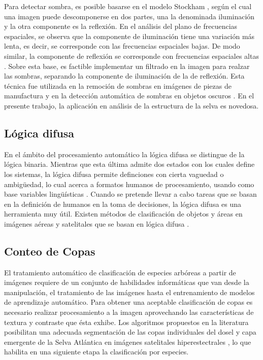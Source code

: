 Para detectar sombra, es posible basarse en el modelo Stockham \cite{stockham_image_1972}, según el cual una imagen puede descomponerse en dos partes, una la denominada iluminación y la otra componente es la reflexión. En el análisis del plano de frecuencias espaciales, se observa que la componente de iluminación tiene una variación más lenta, es decir, se corresponde con las frecuencias espaciales bajas. De modo similar, la componente de reflexión se corresponde con frecuencias espaciales altas \cite{oppenheim_nonlinear_1968}. Sobre esta base, es factible implementar un filtrado en la imagen para realzar las sombras, separando la componente de iluminación de la de reflexión. Esta técnica fue utilizada en la remoción de sombras en imágenes de piezas de manufactura \cite{yang_research_2012} y en la detección automática de sombras en objetos oscuros \cite{etemadnia_automatic_2003}. En el presente trabajo, la aplicación en análisis de la estructura de la selva es novedosa.


\subsection{Lógica difusa} 
En el ámbito del procesamiento automático la lógica difusa se distingue de la lógica binaria. Mientras que esta última admite dos estados con los cuales define los sistemas, la lógica difusa permite definciones con cierta vaguedad o ambigüedad, lo cual acerca a formatos humanos de procesamiento, usando como base variables lingüísticas \cite{zadeh_concept_1975}. Cuando se pretende llevar a cabo tareas que se basan en la definición de humanos en la toma de decisiones, la lógica difusa es una herramienta muy útil. Existen métodos de clasificación de objetos y áreas en imágenes aéreas y satelitales que se basan en lógica difusa \cite{duarte_velasco_aplicaciones_2000, gutierrez_uso_2005}.
\subsection{Conteo de Copas}
El tratamiento automático de clasificación de especies arbóreas a partir de imágenes requiere de un conjunto de habilidades informáticas que van desde la manipulación, el tratamiento de las imágenes hasta el entrenamiento de modelos de aprendizaje automático. Para obtener una aceptable clasificación de copas es necesario realizar procesamiento a la imagen aprovechando las características de textura y contraste que ésta exhibe. Los algoritmos propuestos en la literatura posibilitan una adecuada segmentación de las copas individuales del dosel y capa emergente de la Selva Atlántica en imágenes satelitales hiperestectrales \cite{ferreira_tree_2019}, lo que habilita en una siguiente etapa la clasificación por especies. 

